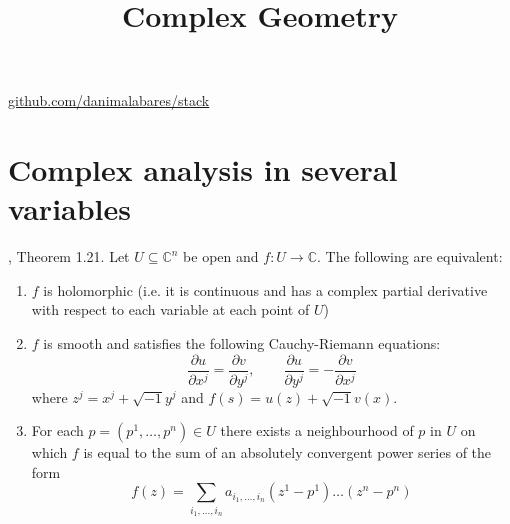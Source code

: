 



\title{Complex Geometry}
\maketitle

\label{section-phantom}
\hfill
\href{http://github.com/danimalabares/stack}{github.com/danimalabares/stack}

\tableofcontents

\section{Complex analysis in several variables}
\label{section-complex-analysis-in-several-variables}

\begin{lemma}
\label{lemma-holomorphic-function-characterization}
\cite{lec}, Theorem 1.21. Let $U\subseteq\mathbb{C}^n$ be open and $f:U\to
\mathbb{C}$. The following are equivalent:
\begin{enumerate}
\item $f$ is holomorphic (i.e. it is continuous and has a complex partial
derivative with respect to each variable at each point of $U$)
\item $f$ is smooth and satisfies the following Cauchy-Riemann equations:
\begin{equation}
\label{equation-Cauchy-Riemann-several-variables}
\frac{\partial u}{\partial x^j}=\frac{\partial v}{\partial y^j},\qquad 
\frac{\partial u}{\partial y^j}=-\frac{\partial v}{\partial x^j}
\end{equation}
where $z^j=x^j+\sqrt{-1}y^j$ and $f(s)=u(z)+\sqrt{-1}v(x)$.
\item For each $p=(p^1,\ldots,p^n)\in U$ there exists a neighbourhood of $p$ in
$U$ on which $f$ is equal to the sum of an absolutely convergent power series of
the form
\begin{equation}
\label{equation-Taylor-series-several-variables}
f(z)=\sum_{i_1,\ldots,i_n}a_{i_1,\ldots,i_n}(z^1-p^1)\ldots(z^n-p^n)
\end{equation}
\end{enumerate}
\end{lemma}

